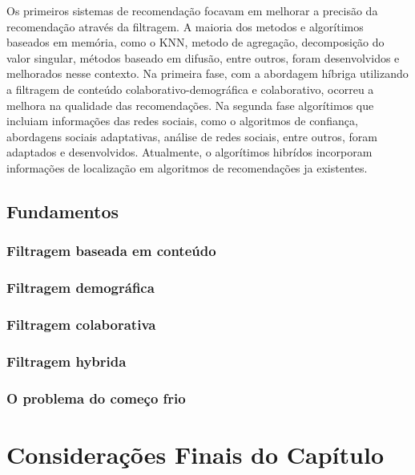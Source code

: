 Os primeiros sistemas de recomendação focavam em melhorar a precisão da recomendação através da filtragem. A maioria dos metodos e algorítimos baseados em memória, como o KNN, metodo de agregação, decomposição do valor singular, métodos baseado em difusão, entre outros, foram desenvolvidos e melhorados nesse contexto. Na primeira fase, com a abordagem híbriga utilizando a filtragem de conteúdo colaborativo-demográfica e colaborativo, ocorreu a melhora na qualidade das recomendações. Na segunda fase algorítimos que incluiam informações das redes sociais, como o algoritmos de confiança, abordagens sociais adaptativas, análise de redes sociais, entre outros, foram adaptados e desenvolvidos. Atualmente, o algorítimos hibrídos incorporam informações de localização em algoritmos de recomendações ja existentes. 

\subsection{Fundamentos}

\subsubsection{Filtragem baseada em conteúdo}

\subsubsection{Filtragem demográfica}

\subsubsection{Filtragem colaborativa}

\subsubsection{Filtragem hybrida}

\subsubsection{O problema do começo frio}


\section{Considerações Finais do Capítulo}



